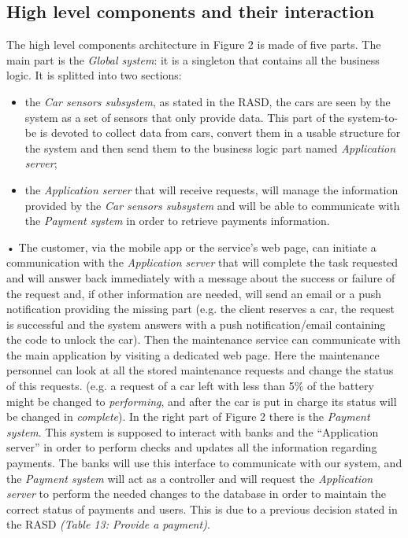 \documentclass[10pt, a4paper,titlepage]{article}
\begin{document}
\subsection{High level components and their interaction}
The high level components architecture in Figure 2 is made of five parts. The main part is the \emph{Global system}: it is a singleton that contains all the business logic. It is splitted into two sections: 
\begin{itemize}
\item the \emph{Car sensors subsystem}, as stated in the RASD, the cars are seen by the system as a set of sensors that only provide data. This part of the system-to-be is devoted to collect data from cars, convert them in a usable structure for the system and then send them to the business logic part named \emph{Application server};
\item the \emph{Application server} that will receive requests, will manage the information provided by the \emph{Car sensors subsystem} and will be able to communicate with the \emph{Payment system} in order to retrieve payments information.
\end{itemize}•
The customer, via the mobile app or the service’s web page, can initiate a communication with the \emph{Application server} that will complete the task requested and will answer back immediately with a message about the success or failure of the request and, if other information are needed, will send an email or a push notification providing the missing part (e.g. the client reserves a car, the request is successful and the system answers with a push notification/email containing the code to unlock the car).
Then the maintenance service can communicate with the main application by visiting a dedicated web page. Here the maintenance personnel can look at all the stored maintenance requests and change the status of this requests. (e.g. a request of a car left with less than 5\% of the battery might be changed to \textit{performing}, and after the car is put in charge its status will be changed in \textit{complete}).
In the right part of Figure 2 there is the \emph{Payment system}. This system is supposed to interact with banks and the “Application server” in order to perform checks and updates all the information regarding payments. The banks will use this interface to communicate with our system, and the \emph{Payment system} will act as a controller and will request the \emph{Application server} to perform the needed changes to the database in order to maintain the correct status of payments and users. This is due to a previous decision stated in the RASD \textit{(Table 13: Provide a payment)}.
\end{document}
